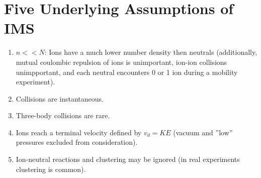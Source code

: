 \documentclass[10pt,a4paper]{article}
\begin{document}
\section{Five Underlying Assumptions of IMS}
\begin{enumerate}
	\item $n << N$: Ions have a much lower number density then neutrals (additionally, mutual coulombic repulsion of ions is unimportant, ion-ion collisions unimpportant, and each neutral encounters 0 or 1 ion during a mobility experiment).
	\item Collisions are instantaneous.
	\item Three-body collisions are rare.
	\item Ions reach a terminal velocity defined by $v_d=KE$ (vacuum and  ''low'' pressures excluded from consideration).
	\item Ion-neutral reactions and clustering may be ignored (in real experiments clustering is common).	
\end{enumerate}

	
\end{document}
